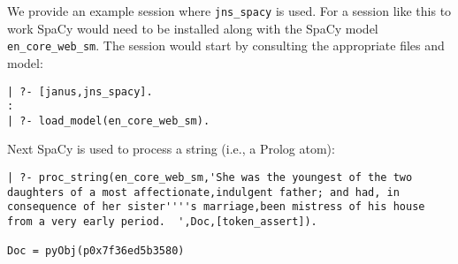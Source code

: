 \begin{example} \rm \label{spacy-examp}
We provide an example session where {\tt jns\_spacy} is used.  For a
session like this to work SpaCy would need to be installed along with
the SpaCy model {\tt en\_core\_web\_sm}.  The session would start by
consulting the appropriate files and model:
\begin{verbatim}
| ?- [janus,jns_spacy].
:
| ?- load_model(en_core_web_sm).
\end{verbatim}
Next SpaCy is used to process a string (i.e., a Prolog atom):
\begin{verbatim}
| ?- proc_string(en_core_web_sm,'She was the youngest of the two daughters of a most affectionate,indulgent father; and had, in consequence of her sister''''s marriage,been mistress of his house from a very early period.  ',Doc,[token_assert]).

Doc = pyObj(p0x7f36ed5b3580)


\end{verbatim}
\end{example}
